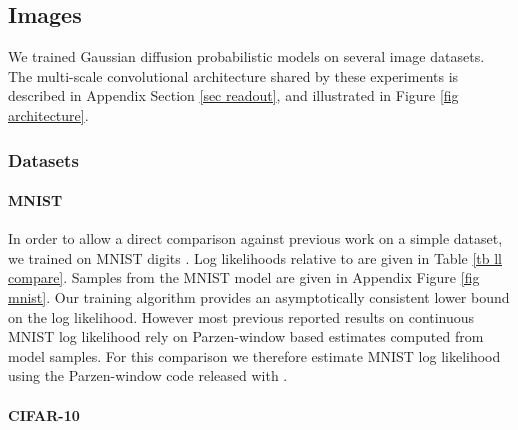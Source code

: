 \documentclass{article}
\newcommand{\mb}{\mathbf}
\begin{document}
\subsection{Images}\label{sec images}

We trained Gaussian diffusion probabilistic models on several image datasets. 
The multi-scale convolutional architecture shared by these experiments is described
in Appendix Section \ref{sec readout}, and illustrated in Figure \ref{fig architecture}.

\subsubsection{Datasets}

\paragraph{MNIST}

In order to allow a direct comparison against previous work on a simple dataset, we trained 
on MNIST digits \cite{MNIST}. 
Log likelihoods relative to \cite{Bengio2012,bengio2013deep,goodfellowgenerative} are given in Table \ref{tb ll compare}. 
Samples from the MNIST model are given in Appendix Figure \ref{fig mnist}. 
Our training algorithm provides an asymptotically consistent lower bound on the log likelihood. However most previous reported 
results on continuous MNIST log likelihood rely on Parzen-window based estimates computed from model samples. 
For this comparison we therefore estimate MNIST log likelihood using the Parzen-window code released with \cite{goodfellowgenerative}.

%

\paragraph{CIFAR-10}
\end{document}
